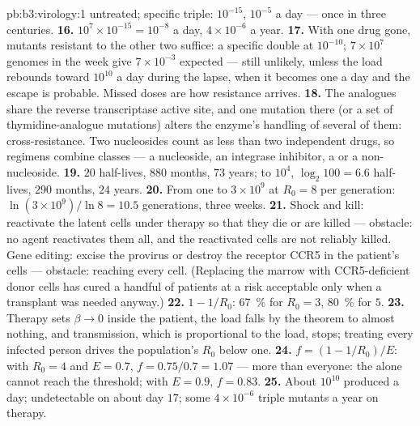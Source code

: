\begin{solution}{pb:b3:virology:1}
untreated; specific triple: $10^{-15}$, $10^{-5}$ a day --- once in
three centuries.
\textbf{16.} $10^{7}\times 10^{-15} = 10^{-8}$ a day, $4\times 10^{-6}$ a
year.
\textbf{17.} With one drug gone, mutants resistant to the other two
suffice: a specific double at $10^{-10}$; $7\times 10^{7}$ genomes in
the week give $7\times 10^{-3}$ expected --- still unlikely, unless the
load rebounds toward $10^{10}$ a day during the lapse, when it becomes
one a day and the escape is probable. Missed doses are how resistance
arrives.
\textbf{18.} The analogues share the reverse transcriptase active site,
and one mutation there (or a set of thymidine-analogue mutations) alters
the enzyme's handling of several of them: cross-resistance. Two
nucleosides count as less than two independent drugs, so regimens
combine classes --- a nucleoside, an integrase inhibitor, a  or a non-nucleoside.
\textbf{19.} $20$ half-lives, $880$ months, $73$ years; to $10^{4}$,
$\log_{2}100 = 6.6$ half-lives, $290$ months, $24$ years.
\textbf{20.} From one  to $3\times 10^{9}$ at $R_{0} = 8$ per
generation: $\ln(3\times 10^{9})/\ln 8 = 10.5$ generations, three weeks.
\textbf{21.} Shock and kill: reactivate the latent cells under therapy so
that they die or are killed --- obstacle: no agent reactivates them
all, and the reactivated cells are not reliably killed. Gene editing:
excise the provirus or destroy the receptor CCR5 in the patient's
cells --- obstacle: reaching every cell. (Replacing the marrow with
CCR5-deficient donor cells has cured a handful of patients at a risk
acceptable only when a transplant was needed anyway.)
\textbf{22.} $1 - 1/R_{0}$: \qty{67}{\%} for $R_{0} = 3$, \qty{80}{\%} for
$5$.
\textbf{23.} Therapy sets $\beta \to 0$ inside the patient, the load
falls by the theorem to almost nothing, and transmission, which is
proportional to the load, stops; treating every infected person drives
the population's $R_{0}$ below one.
\textbf{24.} $f = (1 - 1/R_{0})/E$: with $R_{0} = 4$ and $E = 0.7$, $f =
0.75/0.7 = 1.07$ --- more than everyone: the  alone cannot reach
the threshold; with $E = 0.9$, $f = 0.83$.
\textbf{25.} About $10^{10}$  produced a day; undetectable on
about day $17$; some $4\times 10^{-6}$ triple mutants a year on therapy.
\end{solution}
